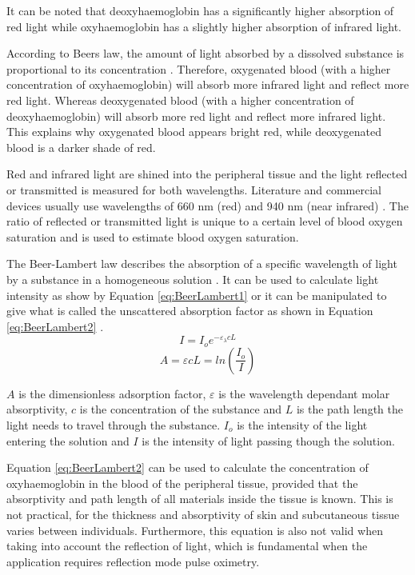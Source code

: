 It can be noted that deoxyhaemoglobin has a significantly higher absorption of red light while oxyhaemoglobin has a slightly higher absorption of infrared light.

\medskip
According to Beers law, the amount of light absorbed by a dissolved substance is proportional to its concentration \citep{lambertANDbeer}. Therefore, oxygenated blood (with a higher concentration of oxyhaemoglobin) will absorb more infrared light and reflect more red light. Whereas deoxygenated blood (with a higher concentration of deoxyhaemoglobin) will absorb more red light and reflect more infrared light. This explains why oxygenated blood appears bright red, while deoxygenated blood is a darker shade of red.

\medskip
Red and infrared light are shined into the peripheral tissue and the light reflected or transmitted is measured for both wavelengths. Literature and commercial devices usually use wavelengths of 660 nm (red) and 940 nm (near infrared) \citep{tytler1986nellcor, ti2012datasheet, bagha2011real, bheema2013spo2, duun2007novel}. The ratio of reflected or transmitted light is unique to a certain level of blood oxygen saturation and is used to estimate blood oxygen saturation.

\medskip
The Beer-Lambert law describes the absorption of a specific wavelength of light by a substance in a homogeneous solution \citep{bagha2011real}. It can be used to calculate light intensity as show by Equation \ref{eq:BeerLambert1} or it can be manipulated to give what is called the unscattered absorption factor as shown in Equation \ref{eq:BeerLambert2} \citep{kennedy2015introduction}.
\begin{equation}
\label{eq:BeerLambert2}
I=I_o e^{-\varepsilon _\lambda cL}
\end{equation}
\begin{equation}
\label{eq:BeerLambert1}
A=\varepsilon cL=ln\left( \frac{I_o}{I}\right)
\end{equation}

\medskip
$A$ is the dimensionless adsorption factor, $\varepsilon$ is the wavelength dependant molar absorptivity, $c$ is the concentration of the substance and $L$ is the path length the light needs to travel through the substance. $I_o$ is the intensity of the light entering the solution and $I$ is the intensity of light passing though the solution.

\medskip
Equation \ref{eq:BeerLambert2} can be used to calculate the concentration of oxyhaemoglobin in the blood of the peripheral tissue, provided that the absorptivity and path length of all materials inside the tissue is known. This is not practical, for the thickness and absorptivity of skin and subcutaneous tissue varies between individuals. Furthermore, this equation is also not valid when taking into account the reflection of light, which is fundamental when the application requires reflection mode pulse oximetry.

